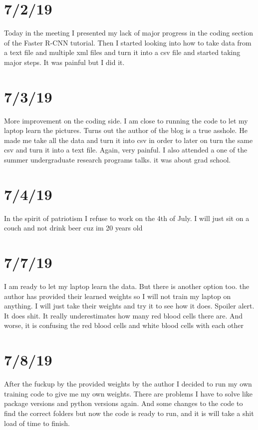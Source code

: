 \documentclass{article}
\begin{document}
\section{7/2/19}
Today in the meeting I presented my lack of major progress in the coding section of the Faster R-CNN tutorial. Then I started looking into how to take data from a text file and multiple xml files and turn it into a csv file and started taking major steps. It was painful but I did it. 

\section{7/3/19}
More improvement on the coding side. I am close to running the code to let my laptop learn the pictures. Turns out the author of the blog is a true asshole. He made me take all the data and turn it into csv in order to later on turn the same csv and turn it into a text file. Again, very painful. I also attended a one of the summer undergraduate research programs talks. it was about grad school.

\section{7/4/19}
In the spirit of patriotism I refuse to work on the 4th of July. I will just sit on a couch and not drink beer cuz im 20 years old

\section{7/7/19}
I am ready to let my laptop learn the data. But there is another option too. the author has provided their learned weights so I will not train my laptop on anything. I will just take their weights and try it to see how it does. Spoiler alert. It does shit. It really underestimates how many red blood cells there are. And worse, it is confusing the red blood cells and white blood cells with each other

\section{7/8/19}
After the fuckup by the provided weights by the author I decided to run my own training code to give me my own weights. There are problems I have to solve like package versions and python versions again. And some changes to the code to find the correct folders but now the code is ready to run, and it is will take a shit load of time to finish.
\end{document}
